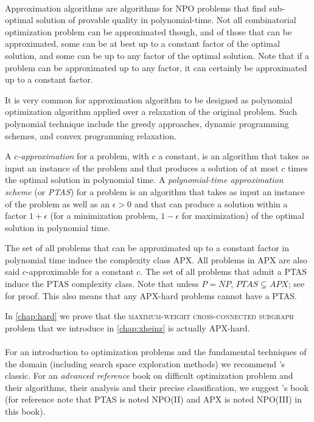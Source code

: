 		\paragraph{}
		Approximation algorithms are algorithms for NPO problems that find sub-optimal solution of provable quality in polynomial-time.
		Not all combinatorial optimization problem can be approximated though, and of those that can be approximated, some can be at best up to a constant factor of the optimal solution, and some can be up to any factor of the optimal solution.
		Note that if a problem can be approximated up to any factor, it can certainly be approximated up to a constant factor.

		It is very common for approximation algorithm to be designed as polynomial optimization algorithm applied over a relaxation of the original problem.
		Such polynomial technique include the greedy approaches, dynamic programming schemes, and convex programming relaxation.

		A \emph{$c$-approximation} for a problem, with $c$ a constant, is an algorithm that takes as input an instance of the problem and that produces a solution of at most $c$ times the optimal solution in polynomial time.
		A \emph{polynomial-time approximation scheme} (or \emph{PTAS}) for a problem is an algorithm that takes as input an instance of the problem as well as an $\epsilon > 0$ and that can produce a solution within a factor $1 + \epsilon$ (for a minimization problem, $1 - \epsilon$ for maximization) of the optimal solution in polynomial time.

		The set of all problems that can be approximated up to a constant factor in polynomial time induce the complexity class APX.
		All problems in APX are also said $c$-approximable for a constant $c$.
		The set of all problems that admit a PTAS induce the PTAS complexity class.
		Note that unless $P = NP$, $PTAS \subsetneq APX$; see \parencite[p. 20]{jansen1998introduction} for proof.
		This also means that any APX-hard problems cannot have a PTAS.
		
		In \cref{chap:hard} we prove that the \textsc{maximum-weight cross-connected subgraph} problem that we introduce in \cref{chap:xheinz} is actually APX-hard.

		\paragraph{}
		\paragraph{}
		For an introduction to optimization problems and the fundamental techniques of the domain (including search space exploration methods) we recommend \textcite{papadimitriou1982combinatorial}'s classic.
		For an \emph{advanced reference} book on difficult optimization problem and their algorithms, their analysis and their precise classification, we suggest \textcite{hromkovivc2013algorithmics}'s book (for reference note that PTAS is noted NPO(II) and APX is noted NPO(III) in this book).

